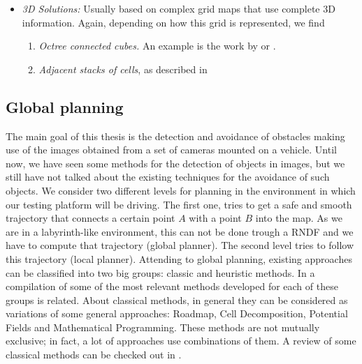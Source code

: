 \begin{itemize}
\begin{enumerate}
  \end{enumerate} 
 \item \emph{3D Solutions:} Usually based on complex grid maps that use complete 3D information. Again, depending on how this grid is represented, we find 
 \begin{enumerate}
   \item \emph{Octree connected cubes.} An example is the work by \cite{wurm2010octomap} or \cite{broggi2013}.
   \item \emph{Adjacent stacks of cells}, as described in \cite{Moravec96robotspatial} 
 \end{enumerate}
\end{itemize}

\subsection{Global planning}\label{ch:chapter00_02_06}

The main goal of this thesis is the detection and avoidance of obstacles making use of the images obtained from a set of cameras mounted on a vehicle. Until now, we have seen some methods for the detection of objects in images, but we still have not talked about the existing techniques for the avoidance of such objects. We consider two different levels for planning in the environment in which our testing platform will be driving. The first one, tries to get a safe and smooth trajectory that connects a certain point $A$ with a point $B$ into the map. As we are in a labyrinth-like environment, this can not be done trough a \ac{RNDF} and we have to compute that trajectory (global planner). The second level tries to follow this trajectory (local planner).
Attending to global planning, existing approaches can be classified into two big groups: classic and heuristic methods. In \cite{masehian2007classic} a compilation of some of the most relevant methods developed for each of these groups is related.
About classical methods, in general they can be considered as variations of some general approaches: Roadmap, Cell Decomposition, Potential Fields and Mathematical Programming. These methods are not mutually exclusive; in fact, a lot of approaches use combinations of them. A review of some classical methods can be checked out in \cite{hwang1992gross}.
 

